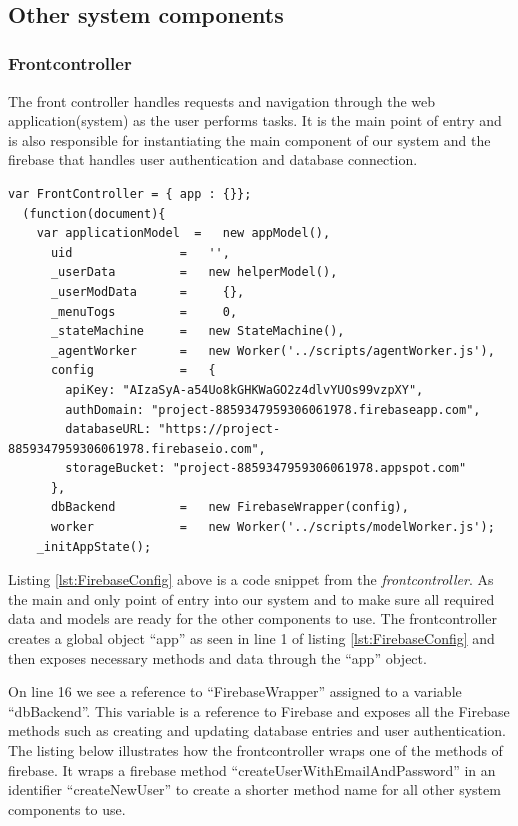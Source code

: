 \begin{lstlisting}[caption={}, label={lst:}]
    
\end{lstlisting}

\subsection{Other system components}
\subsubsection{Frontcontroller}
The front controller handles requests and navigation through the web application(system) as the user performs tasks. It is the main point of entry and is also responsible for instantiating the main component of our system and the firebase \cite{website:Firebase} that handles user authentication and database connection.

\begin{lstlisting}[caption={Initiating frontcontroller and creating an instance of Firebase}, label={lst:FirebaseConfig}]
var FrontController = { app : {}};
  (function(document){
    var applicationModel  =   new appModel(),
      uid               =   '',
      _userData         =   new helperModel(),
      _userModData      =     {},
      _menuTogs         =     0,
      _stateMachine     =   new StateMachine(),
      _agentWorker      =   new Worker('../scripts/agentWorker.js'),
      config            =   {
        apiKey: "AIzaSyA-a54Uo8kGHKWaGO2z4dlvYUOs99vzpXY",
        authDomain: "project-8859347959306061978.firebaseapp.com",
        databaseURL: "https://project-8859347959306061978.firebaseio.com",
        storageBucket: "project-8859347959306061978.appspot.com"
      },
      dbBackend         =   new FirebaseWrapper(config),
      worker            =   new Worker('../scripts/modelWorker.js');
    _initAppState();
\end{lstlisting}
Listing \ref{lst:FirebaseConfig} above is a code snippet from the \emph{frontcontroller}. As the main and only point of entry into our system and to make sure all required data and models are ready for the other components to use. The frontcontroller creates a global object ``app'' as seen in line 1 of listing \ref{lst:FirebaseConfig} and then exposes necessary methods and data through the ``app'' object.

On line 16 we see a reference to ``FirebaseWrapper'' assigned to a variable ``dbBackend''. This variable is a reference to Firebase and exposes all the Firebase methods such as creating and updating database entries and user authentication. The listing below illustrates how the frontcontroller wraps one of the methods of firebase. It wraps a firebase method ``createUserWithEmailAndPassword'' in an identifier ``createNewUser'' to create a shorter method name for all other system components to use.

